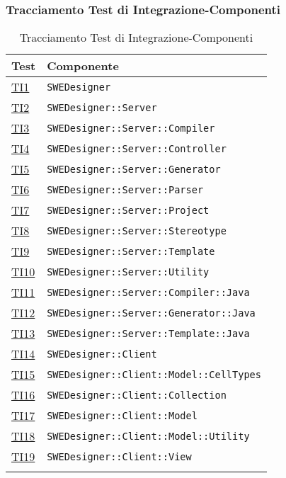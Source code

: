 \subsubsection{Tracciamento Test di Integrazione-Componenti}
\normalsize
\begin{longtable}{|>{\centering}m{3cm}|m{9cm}<{\centering}|}
\hline 
\textbf{Test} & \textbf{Componente}\\
\hline
\endhead
\hyperlink{TI1}{TI1} & \texttt{SWEDesigner}\\ \hline
\hyperlink{TI2}{TI2} & \texttt{SWEDesigner::Server}\\ \hline
\hyperlink{TI3}{TI3} & \texttt{SWEDesigner::Server::Compiler}\\ \hline
\hyperlink{TI4}{TI4} & \texttt{SWEDesigner::Server::Controller}\\ \hline
\hyperlink{TI5}{TI5} & \texttt{SWEDesigner::Server::Generator}\\ \hline
\hyperlink{TI6}{TI6} & \texttt{SWEDesigner::Server::Parser}\\ \hline
\hyperlink{TI7}{TI7} & \texttt{SWEDesigner::Server::Project}\\ \hline
\hyperlink{TI8}{TI8} & \texttt{SWEDesigner::Server::Stereotype}\\ \hline
\hyperlink{TI9}{TI9} & \texttt{SWEDesigner::Server::Template}\\ \hline
\hyperlink{TI10}{TI10} & \texttt{SWEDesigner::Server::Utility}\\ \hline
\hyperlink{TI11}{TI11} & \texttt{SWEDesigner::Server::Compiler::Java}\\ \hline
\hyperlink{TI12}{TI12} & \texttt{SWEDesigner::Server::Generator::Java}\\ \hline
\hyperlink{TI13}{TI13} & \texttt{SWEDesigner::Server::Template::Java}\\ \hline
\hyperlink{TI14}{TI14} & \texttt{SWEDesigner::Client}\\ \hline
\hyperlink{TI15}{TI15} & \texttt{SWEDesigner::Client::Model::CellTypes}\\ \hline
\hyperlink{TI16}{TI16} & \texttt{SWEDesigner::Client::Collection}\\ \hline
\hyperlink{TI17}{TI17} & \texttt{SWEDesigner::Client::Model}\\ \hline
\hyperlink{TI18}{TI18} & \texttt{SWEDesigner::Client::Model::Utility}\\ \hline
\hyperlink{TI19}{TI19} & \texttt{SWEDesigner::Client::View}\\ \hline
\caption[Tracciamento Test di Integrazione-Componenti]{Tracciamento Test di Integrazione-Componenti}
\label{tabella:ts-requi}
\end{longtable}
\clearpage

